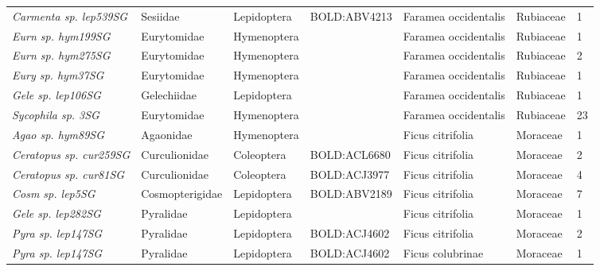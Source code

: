 \documentclass[11pt]{article}
\begin{document}
\begin{landscape}
\begin{longtable}{@{}lllllll@{}}
\textit{Carmenta sp. lep539SG}                        & Sesiidae        & Lepidoptera  & BOLD:ABV4213 & Faramea occidentalis               & Rubiaceae        & 1     \\
\textit{Eurn sp. hym199SG}                            & Eurytomidae     & Hymenoptera  &              & Faramea occidentalis               & Rubiaceae        & 1     \\
\textit{Eurn sp. hym275SG}                            & Eurytomidae     & Hymenoptera  &              & Faramea occidentalis               & Rubiaceae        & 2     \\
\textit{Eury sp. hym37SG}                             & Eurytomidae     & Hymenoptera  &              & Faramea occidentalis               & Rubiaceae        & 1     \\
\textit{Gele sp. lep106SG}                            & Gelechiidae     & Lepidoptera  &              & Faramea occidentalis               & Rubiaceae        & 1     \\
\textit{Sycophila sp. 3SG}                            & Eurytomidae     & Hymenoptera  &              & Faramea occidentalis               & Rubiaceae        & 23    \\
\textit{Agao sp. hym89SG}                             & Agaonidae       & Hymenoptera  &              & Ficus citrifolia                   & Moraceae         & 1     \\
\textit{Ceratopus sp. cur259SG}                       & Curculionidae   & Coleoptera   & BOLD:ACL6680 & Ficus citrifolia                   & Moraceae         & 2     \\
\textit{Ceratopus sp. cur81SG}                        & Curculionidae   & Coleoptera   & BOLD:ACJ3977 & Ficus citrifolia                   & Moraceae         & 4     \\
\textit{Cosm sp. lep5SG}                              & Cosmopterigidae & Lepidoptera  & BOLD:ABV2189 & Ficus citrifolia                   & Moraceae         & 7     \\
\textit{Gele sp. lep282SG}                            & Pyralidae       & Lepidoptera  &              & Ficus citrifolia                   & Moraceae         & 1     \\
\textit{Pyra sp. lep147SG}                            & Pyralidae       & Lepidoptera  & BOLD:ACJ4602 & Ficus citrifolia                   & Moraceae         & 2     \\
\textit{Pyra sp. lep147SG}                            & Pyralidae       & Lepidoptera  & BOLD:ACJ4602 & Ficus colubrinae                   & Moraceae         & 1     \\

\end{longtable}
\end{landscape}
\end{document}
